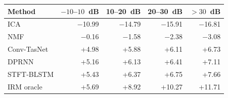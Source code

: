 \begin{tabular}{lrrrr}
\toprule
Method & $-10$--$10$~dB & 10--20~dB & 20--30~dB & ${>}30$~dB \\
\midrule
ICA & $-$10.99 & $-$14.79 & $-$15.91 & $-$16.81 \\
NMF & $-$0.16 & $-$1.58 & $-$2.38 & $-$3.08 \\
Conv-TasNet & +4.98 & +5.88 & +6.11 & +6.73 \\
DPRNN & +5.16 & +6.13 & +6.41 & +7.11 \\
STFT-BLSTM & +5.43 & +6.37 & +6.75 & +7.66 \\
\midrule
IRM oracle & +5.69 & +8.92 & +10.27 & +11.71 \\
\bottomrule
\end{tabular}

